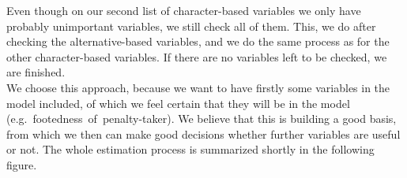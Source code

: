 \documentclass[12pt,dvipsnames]{article}%
\begin{document}
Even though on our second list of character-based variables we only have probably unimportant variables, we still check all of them. This, we do after checking the alternative-based variables, and we do the same process as for the other character-based variables. If there are no variables left to be checked, we are finished. \\
We choose this approach, because we want to have firstly some variables in the model included, of which we feel certain that they will be in the model \mbox{(e.g. footedness of penalty-taker)}. We believe that this is building a good basis, from which we then can make good decisions whether further variables are useful or not. The whole estimation process is summarized shortly in the following figure.

\end{document}
